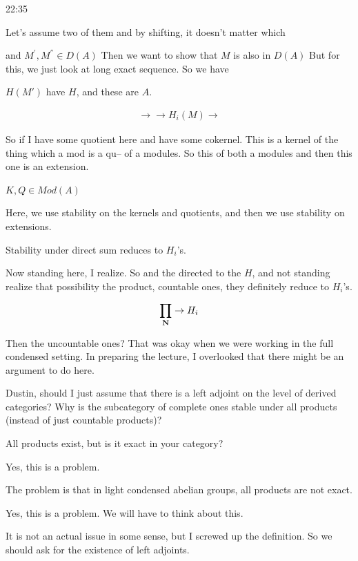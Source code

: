 \begin{unfinished}{22:35}
\begin{sketch}
Let's assume two of them and by shifting, it doesn't matter which 

and $M^{'}, M^{''} \in D(A)$
Then we want to show that $M$ is also in $D(A)$
But for this, we just look at long exact sequence. So we have 

$H(M')$ have $H$, and these are $A$. 

\begin{align*}
\to \to H_i(M) \to   %
\end{align*}

So if I have some quotient here and have some cokernel. This is a kernel of the thing which a mod is a qu-- of a modules. So this of both a modules and then this one is an extension.

$K, Q \in Mod(A)$

Here, we use stability on the kernels and quotients, and then we use stability on extensions. 


Stability under direct sum reduces to $H_i$'s.

Now standing here, I realize. So and the directed to the $H$, and not standing realize that possibility the product, countable ones, they definitely reduce to $H_i$'s.

\begin{align*}
\prod_\N \to H_i %
\end{align*}


\end{sketch}

Then the uncountable ones? That was okay when we were working in the full condensed setting. In preparing the lecture, I overlooked that there might be an argument to do here.

\scholze Dustin, should I just assume that there is a left adjoint on the level of derived categories? Why is the subcategory of complete ones stable under all products (instead of just countable products)?

\gabber All products exist, but is it exact in your category?

\clausen Yes, this is a problem.

\scholze The problem is that in light condensed abelian groups, all products are not exact.

\clausen Yes, this is a problem. We will have to think about this.

\scholze It is not an actual issue in some sense, but I screwed up the definition. So we should ask for the existence of left adjoints.


\end{unfinished}
